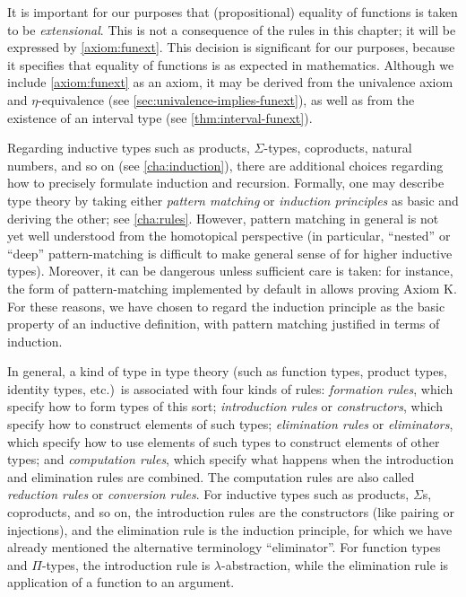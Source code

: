 It is important for our purposes that (propositional) equality of functions is taken to be \emph{extensional}.
This is not a consequence of the rules in this chapter; it will be expressed by \autoref{axiom:funext}.
%
This decision is significant for our purposes, because it specifies that equality of functions is as expected in mathematics.  Although we include \autoref{axiom:funext} as an axiom, it may be derived from the univalence axiom and $\eta$-equivalence (see \autoref{sec:univalence-implies-funext}), as well as from the existence of an interval type (see \autoref{thm:interval-funext}).

Regarding inductive types such as products, $\Sigma$-types, coproducts, natural numbers, and so on (see \autoref{cha:induction}), there are additional choices regarding how to precisely formulate induction and recursion.
%
Formally, one may describe type theory by taking either \emph{pattern matching} or \emph{induction principles} as basic and deriving the other; see \autoref{cha:rules}.
However, pattern matching in general is not yet well understood from the homotopical perspective (in particular, ``nested'' or ``deep'' pattern-matching is difficult to make general sense of for higher inductive types).
Moreover, it can be dangerous unless sufficient care is taken: for instance, the form of pattern-matching implemented by default in \Agda
{}%
allows proving Axiom K.
%
For these reasons, we have chosen to regard the induction principle as the basic property of an inductive definition, with pattern matching justified in terms of induction.

%
In general, a kind of type in type theory (such as function types, product types, identity types, etc.)\ is associated with four kinds of rules: \emph{formation rules},
%
%
which specify how to form types of this sort; \emph{introduction rules}
%
%
or \emph{constructors},
%
which specify how to construct elements of such types; \emph{elimination rules}
%
%
or \emph{eliminators},
%
which specify how to use elements of such types to construct elements of other types; and \emph{computation rules},
%
%
which specify what happens when the introduction and elimination rules are combined. The computation rules are also called \emph{reduction rules} or \emph{conversion rules}.
%
%
For inductive types such as products, $\Sigma$s, coproducts, and so on, the introduction rules are the constructors (like pairing or injections), and the elimination rule is the induction principle, for which we have already mentioned the alternative terminology ``eliminator''.
For function types and $\Pi$-types, the introduction rule is $\lambda$-abstraction, while the elimination rule is application of a function to an argument.

